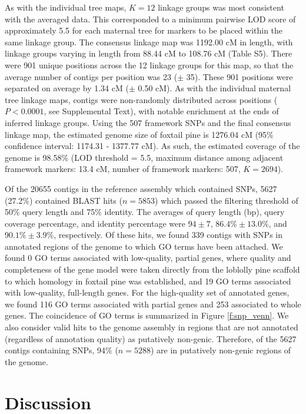 \documentclass[smallextended]{svjour3}
\begin{document}
As with the individual tree maps, $K = 12$ linkage groups was most consistent
with the averaged data. This corresponded to a minimum pairwise LOD score of
approximately 5.5 for each maternal tree for markers to be placed within the
same linkage group.  The consensus linkage map was 1192.00 cM in length, with
linkage groups varying in length from 88.44 cM to 108.76 cM (Table S5). There
were 901 unique positions across the 12 linkage groups for this map, so that the
average number of contigs per position was 23 ($\pm$ 35). These 901 positions
were separated on average by 1.34 cM ($\pm$ 0.50 cM). As with the individual
maternal tree linkage maps, contigs were non-randomly distributed across
positions ($P < 0.0001$, see Supplemental Text), with notable enrichment at the
ends of inferred linkage groups. Using the 507 framework SNPs and the final
consensus linkage map, the estimated genome size of foxtail pine is 1276.04 cM
(95\% confidence interval: 1174.31 - 1377.77 cM). As such, the estimated
coverage of the genome is 98.58\% (LOD threshold = 5.5, maximum distance among
adjacent framework markers: 13.4 cM, number of framework markers: 507, $K =
2694$).

Of the \num{20655} contigs in the reference assembly which contained SNPs,
\num{5627} (27.2\%) contained BLAST hits ($n=5853$) which passed the filtering
threshold of 50\% query length and 75\% identity.  The averages of query length
(bp), query coverage percentage, and identity percentage were $94 \pm 7$,
$86.4\% \pm 13.0\%$, and $90.1\% \pm 3.9\%$, respectively. Of these hits, we
found 339 contigs with SNPs in annotated regions of the genome to which GO terms
have been attached. We found 0 GO terms associated with low-quality, partial
genes, where quality and completeness of the gene model were taken directly from
the loblolly pine scaffold to which homology in foxtail pine was established,
and 19 GO terms associated with low-quality, full-length genes. For the
high-quality set of annotated genes, we found 116 GO terms associated with
partial genes and 253 associated to whole genes.  The coincidence of GO terms is
summarized in Figure \ref{f:snp_venn}. We also consider valid hits to the genome
assembly in regions that are not annotated (regardless of annotation quality) as
putatively non-genic. Therefore, of the \num{5627} contigs containing SNPs, 94\%
($n=5288$) are in putatively non-genic regions of the genome.



\section*{Discussion}
\end{document}
